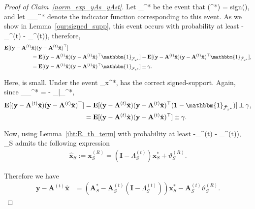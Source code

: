 \documentclass{article}
\newcommand{\sgn}{{\rm sign}}
\newcommand{\HT}{{\c{T}}}
\def\[#1\]{{$#1$}}
\def\b#1{{\mathbf{#1}}}
\def\c#1{{\mathcal{#1}}}
\begin{document}
\begin{proof}[Proof of Claim~\ref{norm_exp_yAs_yAst}]
	
	Let \[\mathcal{F}_{\b{x}^*}\] be the event that \[\sgn(\b{x}^*) = \sgn(\hat{\b{x}})\], and let \[\mathbbm{1}_{_{\b{x}^*}}\] denote the indicator function corresponding to this event. As we show in Lemma~\ref{our:signed_supp}, this event occurs with probability at least \[(1 - \delta_{\beta}^{(t)} - \delta_{\HT}^{(t)})\], therefore,
	\begin{align*}
	\mathbf{E}[(\b{y}-\b{A}^{(t)}&\hat{\b{x}})(\b{y}-\b{A}^{(t)}\hat{\b{x}})^\top] \\
	&= \mathbf{E}[(\b{y}-\b{A}^{(t)}\hat{\b{x}}) (\b{y}-\b{A}^{(t)}\hat{\b{x}})^\top\mathbbm{1}_{\mathcal{F}_{\b{x}^*}}] +\mathbf{E}[(\b{y}-\b{A}^{(t)}\hat{\b{x}}) (\b{y}-\b{A}^{(t)}\hat{\b{x}})^\top\mathbbm{1}_{\bar{\mathcal{F}}_{x^*}}], \\
	&= \mathbf{E}[(\b{y}-\b{A}^{(t)}\hat{\b{x}}) (\b{y}-\b{A}^{(t)}\hat{\b{x}})^\top\mathbbm{1}_{\mathcal{F}_{x^*}}] \pm \gamma.
	\end{align*}
	
	Here, \[\gamma\] is small. Under the event \[\mathcal{F}_{x^*}\], \[\hat{\b{x}}\] has the correct signed-support. Again, since \[\mathbbm{1}_{_{\b{x}^*}} =  - _{\bar{}_{\b{x}^*}}\],
	\begin{align*}
	\mathbf{E}[(\b{y}-\b{A}^{(t)}\hat{\b{x}}) (\b{y}-\b{A}^{(t)}\hat{\b{x}})^\top] &= \mathbf{E}[(\b{y}-\b{A}^{(t)}\hat{\b{x}}) (\b{y}-\b{A}^{(t)}\hat{\b{x}})^\top(\mathbf{1} - \mathbbm{1}_{\bar{\mathcal{F}}_{x^*}})] \pm \gamma,\\
	&= \mathbf{E}[(\b{y}-\b{A}^{(t)}\hat{\b{x}}) (\b{y}-\b{A}^{(t)}\hat{\b{x}})^\top] \pm \gamma.
	\end{align*}
	
	Now, using Lemma~\ref{iht:R_th_term} with probability at least \[(1-\delta_{\HT}^{(t)} - \delta_{\beta}^{(t)})\], \[\hat{\b{x}}_S\] admits the following expression
	\begin{align*}
	\hat{\b{x}}_S := \b{x}^{(R)}_S = (\b{I} - \Lambda^{(t)}_S) \b{x}^*_S  + \vartheta^{(R)}_S.
	\end{align*}
	
	Therefore we have
	\begin{align*}
	\b{y} - \b{A}^{(t)}\hat{\b{x}} &=(\b{A}^*_S  - \b{A}^{(t)}_S(\b{I} - \Lambda^{(t)}_S))\b{x}^*_S  - \b{A}^{(t)}_S\vartheta^{(R)}_S.
	\end{align*}
	

\end{proof}
\end{document}
